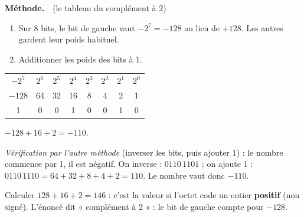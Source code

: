 \documentclass[addpoints, 11pt]{exam}
\newcommand{\methode}{\par\smallskip\noindent\textbf{Méthode.}\ }
\DeclareRobustCommand{\_}{\textunderscore\allowbreak}
\begin{document}
\begin{questions}
\methode\ (le tableau du complément à 2)
\begin{enumerate}
  \item Sur 8 bits, le bit de gauche vaut $-2^7 = -128$ au lieu de $+128$. Les autres gardent leur poids habituel.
  \item Additionner les poids des bits à 1.
\end{enumerate}
\begin{center}
\begin{tabular}{cccccccc}
$-2^7$ & $2^6$ & $2^5$ & $2^4$ & $2^3$ & $2^2$ & $2^1$ & $2^0$\\
$-128$ & 64 & 32 & 16 & 8 & 4 & 2 & 1\\ \hline
1 & 0 & 0 & 1 & 0 & 0 & 1 & 0\\
\end{tabular}
\end{center}
$-128 + 16 + 2 = -110$.

\textit{Vérification par l'autre méthode} (inverser les bits, puis ajouter 1) : le nombre commence par 1, il est négatif. On inverse : $0110\,1101$ ; on ajoute 1 : $0110\,1110 = 64 + 32 + 8 + 4 + 2 = 110$. Le nombre vaut donc $-110$.

\begin{erreur}
Calculer $128 + 16 + 2 = 146$ : c'est la valeur si l'octet code un entier \textbf{positif} (non signé). L'énoncé dit « complément à 2 » : le bit de gauche compte pour $-128$.
\end{erreur}

\end{questions}
\end{document}
